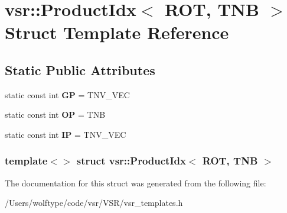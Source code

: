 \hypertarget{structvsr_1_1_product_idx_3_01_r_o_t_00_01_t_n_b_01_4}{\section{vsr\-:\-:Product\-Idx$<$ R\-O\-T, T\-N\-B $>$ Struct Template Reference}
\label{structvsr_1_1_product_idx_3_01_r_o_t_00_01_t_n_b_01_4}
}
\subsection*{Static Public Attributes}
\begin{DoxyCompactItemize}
\item 
\hypertarget{structvsr_1_1_product_idx_3_01_r_o_t_00_01_t_n_b_01_4_a4260dedbafaea033b69bd18ba7812f5d}{static const int {\bfseries G\-P} = T\-N\-V\-\_\-\-V\-E\-C}\label{structvsr_1_1_product_idx_3_01_r_o_t_00_01_t_n_b_01_4_a4260dedbafaea033b69bd18ba7812f5d}

\item 
\hypertarget{structvsr_1_1_product_idx_3_01_r_o_t_00_01_t_n_b_01_4_a6d67b87aef62fc2bd475f23f6fe6b0f7}{static const int {\bfseries O\-P} = T\-N\-B}\label{structvsr_1_1_product_idx_3_01_r_o_t_00_01_t_n_b_01_4_a6d67b87aef62fc2bd475f23f6fe6b0f7}

\item 
\hypertarget{structvsr_1_1_product_idx_3_01_r_o_t_00_01_t_n_b_01_4_a46c7539f17bf520b551873efc8e509c5}{static const int {\bfseries I\-P} = T\-N\-V\-\_\-\-V\-E\-C}\label{structvsr_1_1_product_idx_3_01_r_o_t_00_01_t_n_b_01_4_a46c7539f17bf520b551873efc8e509c5}

\end{DoxyCompactItemize}
\subsubsection*{template$<$$>$ struct vsr\-::\-Product\-Idx$<$ R\-O\-T, T\-N\-B $>$}



The documentation for this struct was generated from the following file\-:\begin{DoxyCompactItemize}
\item 
/\-Users/wolftype/code/vsr/\-V\-S\-R/vsr\-\_\-templates.\-h\end{DoxyCompactItemize}
